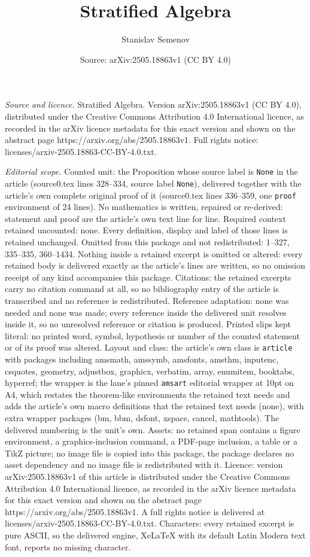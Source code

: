 \documentclass[10pt,a4paper]{amsart}
\title[Stratified Algebra]{Stratified Algebra}
\author{Stanislav Semenov}
\date{Source: arXiv:2505.18863v1 (CC BY 4.0)}
\begin{document}
\maketitle

\noindent\emph{Source and licence.} Stratified Algebra. Version arXiv:2505.18863v1 (CC BY 4.0), distributed under the Creative Commons Attribution 4.0 International licence, as recorded in the arXiv licence metadata for this exact version and shown on the abstract page https://arxiv.org/abs/2505.18863v1. Full rights notice: licenses/arxiv-2505.18863-CC-BY-4.0.txt.\par\smallskip

\noindent\textit{Editorial scope.} Counted unit: the Proposition whose source label is \texttt{None} in the article (source0.tex lines 328--334, source label \texttt{None}), delivered together with the article's own complete original proof of it (source0.tex lines 336--359, one \texttt{proof} environment of 24 lines). No mathematics is written, repaired or re-derived: statement and proof are the article's own text line for line. Required context retained uncounted: none. Every definition, display and label of those lines is retained unchanged. Omitted from this package and not redistributed: 1--327, 335--335, 360--1434. Nothing inside a retained excerpt is omitted or altered: every retained body is delivered exactly as the article's lines are written, so no omission receipt of any kind accompanies this package. Citations: the retained excerpts carry no citation command at all, so no bibliography entry of the article is transcribed and no reference is redistributed. Reference adaptation: none was needed and none was made; every reference inside the delivered unit resolves inside it, so no unresolved reference or citation is produced. Printed slips kept literal: no printed word, symbol, hypothesis or number of the counted statement or of its proof was altered. Layout and class: the article's own class is \texttt{article} with packages including amsmath, amssymb, amsfonts, amsthm, inputenc, csquotes, geometry, adjustbox, graphicx, verbatim, array, enumitem, booktabs, hyperref; the wrapper is the lane's pinned \texttt{amsart} editorial wrapper at 10pt on A4, which restates the theorem-like environments the retained text needs and adds the article's own macro definitions that the retained text needs (none), with extra wrapper packages (bm, bbm, dsfont, xspace, cancel, mathtools). The delivered numbering is the unit's own. Assets: no retained span contains a figure environment, a graphics-inclusion command, a PDF-page inclusion, a table or a TikZ picture; no image file is copied into this package, the package declares no asset dependency and no image file is redistributed with it. Licence: version arXiv:2505.18863v1 of this article is distributed under the Creative Commons Attribution 4.0 International licence, as recorded in the arXiv licence metadata for this exact version and shown on the abstract page https://arxiv.org/abs/2505.18863v1. A full rights notice is delivered at licenses/arxiv-2505.18863-CC-BY-4.0.txt. Characters: every retained excerpt is pure ASCII, so the delivered engine, XeLaTeX with its default Latin Modern text font, reports no missing character.
\end{document}
